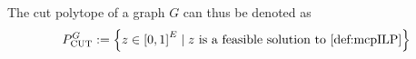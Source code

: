\documentclass[12pt,a4paper]{article}
\theoremstyle{mythm}
\newtheorem{lem}[thm]{Lemma}
\begin{document}
The cut polytope of a graph $ G $ can thus be denoted as 
\begin{align*}
P ^{ G } _{ \text{CUT}  } := \left\{ z \in \left[ 0,1 \right] ^{ E }   \mid  z \text{ is a feasible solution to } \ref{def:mcpILP} \right\} 
\end{align*} 
%
\end{document}
